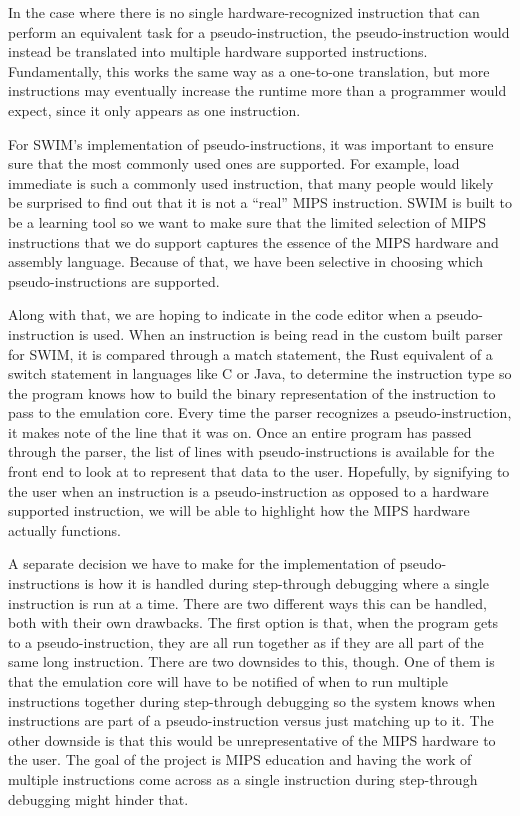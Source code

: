 \documentclass[
    paper=letter,
    parskip=half,
    fontsize=12pt,
    titlepage=firstiscover,
    toc=bibliography,
    numbers=endperiod
]{scrartcl}
\begin{document}
In the case where there is no single hardware-recognized instruction
that can perform an equivalent task for a pseudo-instruction, the
pseudo-instruction would instead be translated into multiple hardware
supported instructions. Fundamentally, this works the same way as a
one-to-one translation, but more instructions may eventually increase
the runtime more than a programmer would expect, since it only appears
as one instruction.

For SWIM's implementation of pseudo-instructions, it was important to
ensure sure that the most commonly used ones are supported. For example,
load immediate is such a commonly used instruction, that many people
would likely be surprised to find out that it is not a ``real'' MIPS
instruction. SWIM is built to be a learning tool so we want to make sure
that the limited selection of MIPS instructions that we do support
captures the essence of the MIPS hardware and assembly language. Because
of that, we have been selective in choosing which pseudo-instructions
are supported.

Along with that, we are hoping to indicate in the code editor when a
pseudo-instruction is used. When an instruction is being read in the
custom built parser for SWIM, it is compared through a match statement,
the Rust equivalent of a switch statement in languages like C or Java,
to determine the instruction type so the program knows how to build the
binary representation of the instruction to pass to the emulation core.
Every time the parser recognizes a pseudo-instruction, it makes note of
the line that it was on. Once an entire program has passed through the
parser, the list of lines with pseudo-instructions is available for the
front end to look at to represent that data to the user. Hopefully, by
signifying to the user when an instruction is a pseudo-instruction as
opposed to a hardware supported instruction, we will be able to
highlight how the MIPS hardware actually functions.

A separate decision we have to make for the implementation of
pseudo-instructions is how it is handled during step-through debugging
where a single instruction is run at a time. There are two different
ways this can be handled, both with their own drawbacks. The first
option is that, when the program gets to a pseudo-instruction, they are
all run together as if they are all part of the same long instruction.
There are two downsides to this, though. One of them is that the
emulation core will have to be notified of when to run multiple
instructions together during step-through debugging so the system knows
when instructions are part of a pseudo-instruction versus just matching
up to it. The other downside is that this would be unrepresentative of
the MIPS hardware to the user. The goal of the project is MIPS education
and having the work of multiple instructions come across as a single
instruction during step-through debugging might hinder that.
\end{document}
